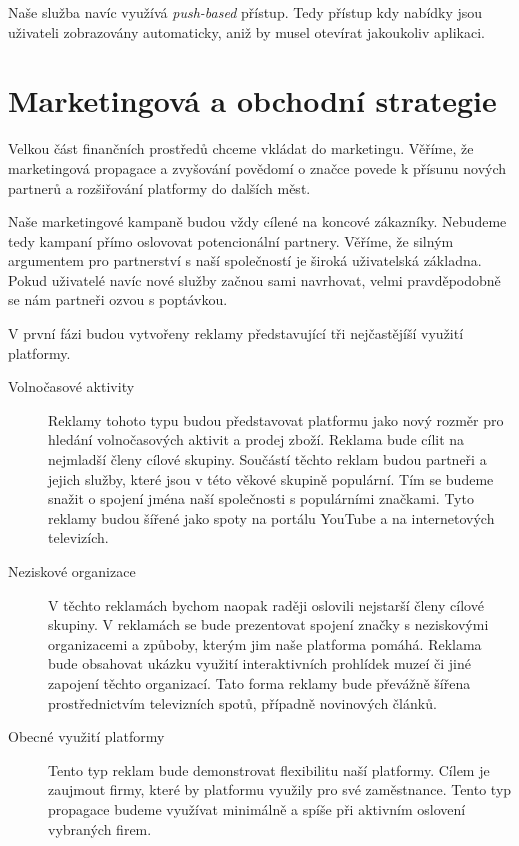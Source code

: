 \documentclass[12pt,czech]{article}
\begin{document}
Naše služba navíc využívá \textit{push-based} přístup.
Tedy přístup kdy nabídky jsou uživateli zobrazovány automaticky, aniž by musel otevírat jakoukoliv aplikaci.

\newpage
\section{Marketingová a obchodní strategie}\label{marketing}

Velkou část finančních prostředů chceme vkládat do marketingu.
Věříme, že marketingová propagace a zvyšování povědomí o značce povede k přísunu nových partnerů a rozšiřování platformy do dalších měst.

Naše marketingové kampaně budou vždy cílené na koncové zákazníky.
Nebudeme tedy kampaní přímo oslovovat potencionální partnery.
Věříme, že silným argumentem pro partnerství s naší společností je široká uživatelská základna.
Pokud uživatelé navíc nové služby začnou sami navrhovat, velmi pravděpodobně se nám partneři ozvou s poptávkou.

V první fázi budou vytvořeny reklamy představující tři nejčastějíší využití platformy.

\begin{description}
    \item[Volnočasové aktivity] Reklamy tohoto typu budou představovat platformu jako nový rozměr pro hledání volnočasových aktivit a prodej zboží.
    Reklama bude cílit na nejmladší členy cílové skupiny.
    Součástí těchto reklam budou partneři a jejich služby, které jsou v této věkové skupině populární.
    Tím se budeme snažit o spojení jména naší společnosti s populárními značkami.
    Tyto reklamy budou šířené jako spoty na portálu YouTube a na internetových televizích.

    \item[Neziskové organizace] V těchto reklamách bychom naopak raději oslovili nejstarší členy cílové skupiny.
    V reklamách se bude prezentovat spojení značky s neziskovými organizacemi a způboby, kterým jim naše platforma pomáhá.
    Reklama bude obsahovat ukázku využití interaktivních prohlídek muzeí či jiné zapojení těchto organizací.
    Tato forma reklamy bude převážně šířena prostřednictvím televizních spotů, případně novinových článků.

    \item[Obecné využití platformy] Tento typ reklam bude demonstrovat flexibilitu naší platformy.
    Cílem je zaujmout firmy, které by platformu využily pro své zaměstnance.
    Tento typ propagace budeme využívat minimálně a spíše při aktivním oslovení vybraných firem.
\end{description}
\end{document}
